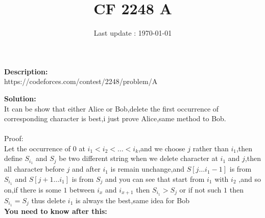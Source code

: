 \documentclass{article}
\begin{document}
\title{\textbf{CF 2248 A}}
\author{}
\date{Last update : \today}

\maketitle

\noindent \textbf{Description:}\\
https://codeforces.com/contest/2248/problem/A

\noindent \textbf{Solution:}\\
It can be show that either Alice or Bob,delete the first occurrence of corresponding character is best,i just prove Alice,same method to Bob.\\
\\
Proof:\\
Let the occurrence of $0$ at ${i_1<i_2<\dots <i_k}$,and we choose $j$ rather than $i_1$,then define $S_{i_1}$ and $S_j$ be two different string when we delete character at $i_1$ and $j$,then all character before $j$ and after $i_1$ is remain unchange,and $S[j\dots i_1-1]$ is from $S_{i_1}$ and $S[j+1\dots i_1]$ is from $S_j$ and you can see that start from $i_1$ with $i_2$ ,and so on,if there is some $1$ between $i_{x}$ and $i_{x+1}$ then $S_{i_1}>S_j$ or if not such $1$ then $S_{i_1}=S_j$ thus delete $i_1$ is always the best,same idea for Bob
\\
\noindent \textbf{You need to know after this:}\\
\end{document}

